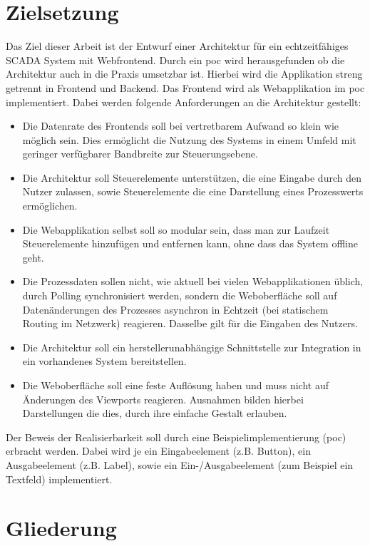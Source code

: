 \section{Zielsetzung}
Das Ziel dieser Arbeit ist der Entwurf einer Architektur für ein
echtzeitfähiges SCADA System mit Webfrontend.
Durch ein \ac{poc} wird herausgefunden ob die Architektur auch in die Praxis umsetzbar ist.
Hierbei wird die Applikation streng getrennt in Frontend und Backend. Das Frontend wird als Webapplikation im \ac{poc} implementiert.
Dabei werden folgende Anforderungen an die Architektur gestellt:
\begin{itemize}
    \item   Die Datenrate des Frontends soll bei vertretbarem Aufwand so klein wie möglich sein.
            Dies ermöglicht die Nutzung des Systems in einem Umfeld mit geringer verfügbarer Bandbreite zur Steuerungsebene.
    \item   Die Architektur soll Steuerelemente unterstützen, die eine Eingabe durch den Nutzer zulassen, sowie Steuerelemente die eine Darstellung eines Prozesswerts ermöglichen.
    \item   Die Webapplikation selbst soll so modular sein, dass man zur Laufzeit Steuerelemente hinzufügen und entfernen kann, ohne dass das System offline geht.
    \item   Die Prozessdaten sollen nicht, wie aktuell bei vielen Webapplikationen üblich, durch Polling synchronisiert werden, sondern die Weboberfläche soll auf Datenänderungen des Prozesses asynchron in Echtzeit (bei statischem Routing im Netzwerk) reagieren. Dasselbe gilt für die Eingaben des Nutzers.
    \item   Die Architektur soll ein herstellerunabhängige Schnittstelle zur Integration in ein vorhandenes System bereitstellen.
    \item   Die Weboberfläche soll eine feste Auflösung haben und muss nicht auf Änderungen des Viewports reagieren.
            Ausnahmen bilden hierbei Darstellungen die dies, durch ihre einfache Gestalt erlauben.
\end{itemize}
Der Beweis der Realisierbarkeit soll durch eine Beispielimplementierung (\ac{poc}) erbracht werden.
Dabei wird je ein Eingabeelement (z.B. Button), ein Ausgabeelement (z.B. Label), sowie ein Ein-/Ausgabeelement (zum Beispiel ein Textfeld) implementiert.

\section{Gliederung}
